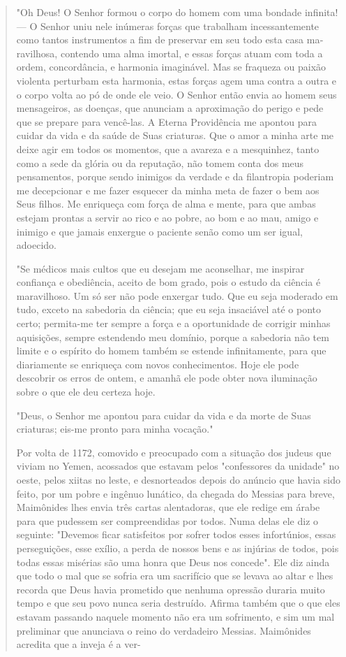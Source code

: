 \begin{quote}
"Oh Deus! O Senhor formou o corpo do homem com uma bonda­de infinita!
--- O Senhor uniu nele inúmeras forças que trabalham incessante­mente
como tantos instrumentos a fim de preservar em seu todo esta casa
ma­ravilhosa, contendo uma alma imortal, e essas forças atuam com toda a
ordem, concordância, e harmonia imaginável. Mas se fraqueza ou paixão
violenta per­turbam esta harmonia, estas forças agem uma contra a outra
e o corpo volta ao pó de onde ele veio. O Senhor então envia ao homem
seus mensageiros, as doenças, que anunciam a aproximação do perigo e
pede que se prepare para vencê-las. A Eterna Providência me apontou para
cuidar da vida e da saúde de Suas criaturas. Que o amor a minha arte me
deixe agir em todos os momentos, que a avareza e a mesquinhez, tanto
como a sede da glória ou da reputação, não tomem conta dos meus
pensamentos, porque sendo inimigos da verdade e da filantropia poderiam
me decepcionar e me fazer esquecer da minha meta de fazer o bem aos Seus
filhos. Me enriqueça com força de alma e mente, para que ambas estejam
prontas a servir ao rico e ao pobre, ao bom e ao mau, amigo e inimigo e
que jamais enxergue o paciente senão como um ser igual, adoecido.

"Se médicos mais cultos que eu desejam me aconselhar, me inspirar
confiança e obediência, aceito de bom grado, pois o estudo da ciência é
mara­vilhoso. Um só ser não pode enxergar tudo. Que eu seja moderado em
tudo, exceto na sabedoria da ciência; que eu seja insaciável até o ponto
certo; permi­ta-me ter sempre a força e a oportunidade de corrigir
minhas aquisições, sem­pre estendendo meu domínio, porque a sabedoria
não tem limite e o espírito do homem também se estende infinitamente,
para que diariamente se enrique­ça com novos conhecimentos. Hoje ele
pode descobrir os erros de ontem, e amanhã ele pode obter nova
iluminação sobre o que ele deu certeza hoje.

"Deus, o Senhor me apontou para cuidar da vida e da morte de Suas
criaturas; eis-me pronto para minha vocação."

Por volta de 1172, comovido e preocupado com a situação dos ju­deus que
viviam no Yemen, acossados que estavam pelos "confessores da uni­dade"
no oeste, pelos xiitas no leste, e desnorteados depois do anúncio que
havia sido feito, por um pobre e ingênuo lunático, da chegada do Messias
para breve, Maimônides lhes envia três cartas alentadoras, que ele
redige em árabe para que pudessem ser compreendidas por todos. Numa
delas ele diz o seguin­te: "Devemos ficar satisfeitos por sofrer todos
esses infortúnios, essas perse­guições, esse exílio, a perda de nossos
bens e as injúrias de todos, pois todas essas misérias são uma honra que
Deus nos concede". Ele diz ainda que todo o mal que se sofria era um
sacrifício que se levava ao altar e lhes recorda que Deus havia
prometido que nenhuma opressão duraria muito tempo e que seu povo nunca
seria destruído. Afirma também que o que eles estavam passando naquele
momento não era um sofrimento, e sim um mal preliminar que anun­ciava o
reino do verdadeiro Messias. Maimônides acredita que a inveja é a ver-


\end{quote}
